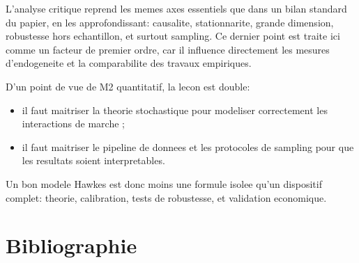 \documentclass[11pt,a4paper]{article}
\begin{document}
L'analyse critique reprend les memes axes essentiels que dans un bilan standard du papier, en les approfondissant: causalite, stationnarite, grande dimension, robustesse hors echantillon, et surtout sampling. Ce dernier point est traite ici comme un facteur de premier ordre, car il influence directement les mesures d'endogeneite et la comparabilite des travaux empiriques.

D'un point de vue de M2 quantitatif, la lecon est double:
\begin{itemize}[leftmargin=1.2cm]
    \item il faut maitriser la theorie stochastique pour modeliser correctement les interactions de marche ;
    \item il faut maitriser le pipeline de donnees et les protocoles de sampling pour que les resultats soient interpretables.
\end{itemize}

Un bon modele Hawkes est donc moins une formule isolee qu'un dispositif complet: theorie, calibration, tests de robustesse, et validation economique.

\newpage
\section*{Bibliographie}
\end{document}
